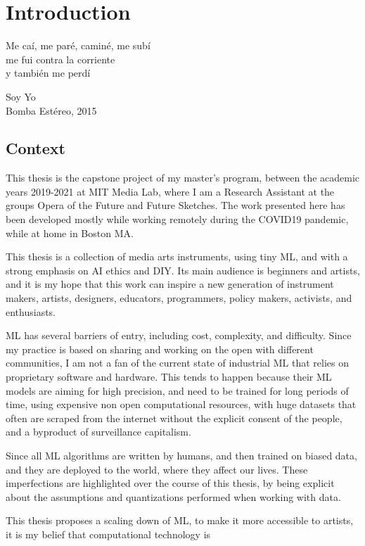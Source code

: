 \chapter{Introduction}

\epigraph{Me caí, me paré, caminé, me subí \\ me fui contra la corriente \\ y también me perdí}{Soy Yo \\ Bomba Estéreo, 2015}

\section{Context}

This thesis is the capstone project of my master's program, between the academic years 2019-2021 at MIT Media Lab, where I am a Research Assistant at the groups Opera of the Future and Future Sketches. The work presented here has been developed mostly while working remotely during the COVID19 pandemic, while at home in Boston MA.

This thesis is a collection of media arts instruments, using tiny \acrshort{ML}, and with a strong emphasis on \acrlong{AI} ethics and \acrlong{DIY}. Its main audience is beginners and artists, and it is my hope that this work can inspire a new generation of instrument makers, artists, designers, educators, programmers, policy makers, activists, and enthusiasts.

\acrfull{ML} has several barriers of entry, including cost, complexity, and difficulty. Since my practice is based on sharing and working on the open with different communities, I am not a fan of the current state of industrial \acrshort{ML} that relies on proprietary software and hardware. This tends to happen because their ML models are aiming for high precision, and need to be trained for long periods of time, using expensive non open computational resources, with huge datasets that often are scraped from the internet without the explicit consent of the people, and a byproduct of surveillance capitalism.

Since all \acrshort{ML} algorithms are written by humans, and then trained on biased data, and they are deployed to the world, where they affect our lives. These imperfections are highlighted over the course of this thesis, by being explicit about the assumptions and quantizations performed when working with data.

This thesis proposes a scaling down of \acrshort{ML}, to make it more accessible to artists, it is my belief that computational technology is 

